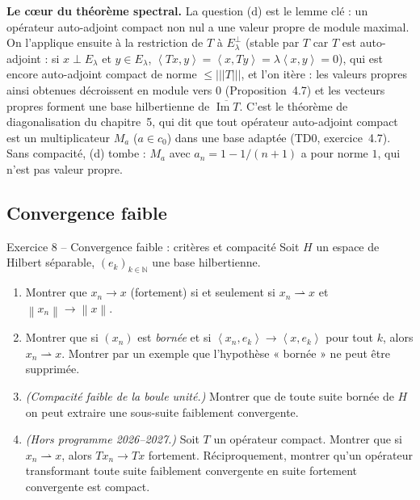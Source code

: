 \documentclass[11pt,a4paper]{article}
\newcommand{\N}{\mathbb{N}}
\newcommand{\adh}[1]{\overline{#1}}
\newcommand{\norm}[1]{\left\|#1\right\|}
\newcommand{\opnorm}[1]{|\!|\!|#1|\!|\!|}
\newcommand{\ps}[2]{\left\langle #1,#2\right\rangle}
\DeclareMathOperator{\Ima}{Im}
\theoremstyle{definition}
\begin{document}
\begin{pointcle}
\textbf{Le c\oe ur du théorème spectral.} La question (d) est le lemme clé : un opérateur auto-adjoint compact non nul a une valeur propre de module maximal. On l'applique ensuite à la restriction de $T$ à $E_\lambda^\perp$ (stable par $T$ car $T$ est auto-adjoint : si $x\perp E_\lambda$ et $y\in E_\lambda$, $\ps{Tx}y=\ps x{Ty}=\lambda\ps xy=0$), qui est encore auto-adjoint compact de norme $\le\opnorm T$, et l'on itère : les valeurs propres ainsi obtenues décroissent en module vers $0$ (Proposition~4.7) et les vecteurs propres forment une base hilbertienne de $\adh{\Ima T}$. C'est le théorème de diagonalisation du chapitre~5, qui dit que tout opérateur auto-adjoint compact est un multiplicateur $M_a$ ($a\in c_0$) dans une base adaptée (TD0, exercice~4.7). Sans compacité, (d) tombe : $M_a$ avec $a_n=1-1/(n+1)$ a pour norme $1$, qui n'est pas valeur propre.
\end{pointcle}

\subsection*{Convergence faible}

\begin{exo}{Exercice 8 -- Convergence faible : critères et compacité}
Soit $H$ un espace de Hilbert séparable, $(e_k)_{k\in\N}$ une base hilbertienne.
\begin{enumerate}[label=(\alph*)]
  \item Montrer que $x_n\to x$ (fortement) si et seulement si $x_n\rightharpoonup x$ et $\norm{x_n}\to\norm x$.
  \item Montrer que si $(x_n)$ est \emph{bornée} et si $\ps{x_n}{e_k}\to\ps x{e_k}$ pour tout $k$, alors $x_n\rightharpoonup x$. Montrer par un exemple que l'hypothèse « bornée » ne peut être supprimée.
  \item \emph{(Compacité faible de la boule unité.)} Montrer que de toute suite bornée de $H$ on peut extraire une sous-suite faiblement convergente.
  \item \emph{(Hors programme 2026--2027.)} Soit $T$ un opérateur compact. Montrer que si $x_n\rightharpoonup x$, alors $Tx_n\to Tx$ fortement. Réciproquement, montrer qu'un opérateur transformant toute suite faiblement convergente en suite fortement convergente est compact.
\end{enumerate}
\end{exo}
\end{document}

